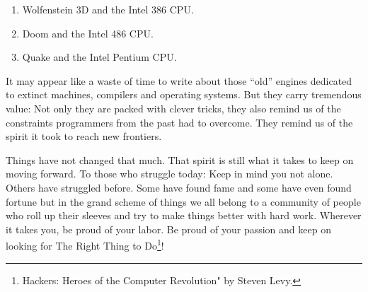 \documentclass[book.tex]{subfiles}
\begin{document}
\begin{enumerate}
\item Wolfenstein 3D and the Intel 386 CPU.
\item Doom and the Intel 486 CPU.
\item Quake and the Intel Pentium CPU.
\end{enumerate}

\bigskip

It may appear like a waste of time to write about those ``old'' engines dedicated to extinct machines, compilers and operating systems. But they carry tremendous value: Not only they are packed with clever tricks, they also remind us of the constraints programmers from the past had to overcome. They remind us of the spirit it took to reach new frontiers.\\
\par
Things have not changed that much. That spirit is still what it takes to keep on moving forward. To those who struggle today: Keep in mind you not alone. Others have struggled before. Some have found fame and some have even found fortune but in the grand scheme of things we all belong to a community of people who roll up their sleeves and try to make things better with hard work. Wherever it takes you, be proud of your labor. Be proud of your passion and keep on looking for The Right Thing to Do\footnote{Hackers: Heroes of the Computer Revolution" by Steven Levy.}!\\



\end{document}
